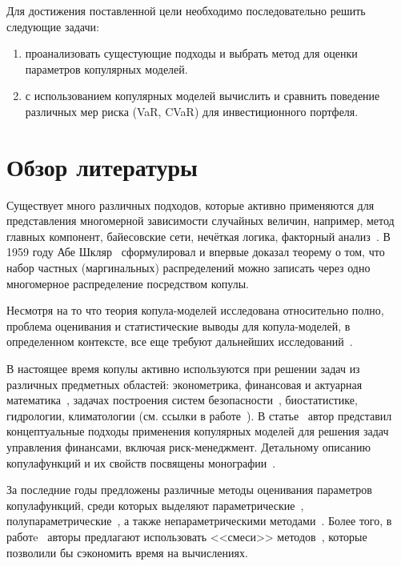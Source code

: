 Для достижения поставленной цели необходимо последовательно решить следующие задачи:
\begin{enumerate}[label=\arabic*)]
    \item проанализовать сущестующие подходы и выбрать метод для оценки параметров копулярных моделей. 
    \item с использованием копулярных моделей вычислить и сравнить поведение различных мер риска (VaR, CVaR) для инвестиционного портфеля.
\end{enumerate}


\section{Обзор литературы}
\label{section:literature}

Существует много различных подходов, которые активно применяются для представления многомерной зависимости случайных величин, например, метод главных компонент, байесовские сети, нечёткая логика, факторный анализ~\cite{Huynh2014, Kole2007}. 
В 1959 году Абе Шкляр~\cite{Sklar1959} сформулировал и впервые доказал теорему о том, что набор частных (маргинальных) распределений можно записать через одно многомерное распределение посредством копулы.

Несмотря на то что теория копула-моделей исследована относительно полно, проблема оценивания и статистические выводы для копула-моделей, в определенном контексте, все
еще требуют дальнейших исследований~\cite{Fantazzini2011}.

В настоящее время копулы активно используются при решении задач из различных предметных областей: эконометрика, финансовая и актуарная математика~\cite{Antonov2016,Atskanov2016,Knyazev2016,  Penikas2014, Travkin2013,  Penikas2010,  Shemyakin2017}, задачах построения систем безопасности~\cite{Sundaresan2011}, биостатистике, гидрологии, климатологии (см. ссылки в работе~\cite{Fantazzini2011}). В статье~\cite{Penikas2010} автор представил концептуальные подходы применения копулярных моделей для решения задач управления финансами, включая риск-менеджмент.
Детальному описанию копула\-функций и их свойств посвящены монографии~\cite{Joe2014, Nelsen1999}.

За последние годы предложены различные методы оценивания параметров копула\-функций, среди которых выделяют параметрические~\cite{Patton2006}, полупараметрические~\cite{Chen2006, Lourme2016}, а также непараметрическими методами~\cite{Fermanian2003, Kim2007}. 
Более того, в работe~\cite{Cherubini2004} авторы предлагают использовать <<смеси>> методов~\cite{Fantazzini2011}, которые позволили бы сэкономить время на вычислениях.

